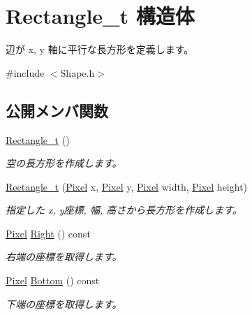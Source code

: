 \hypertarget{struct_rectangle__t}{}\section{Rectangle\+\_\+t 構造体}
\label{struct_rectangle__t}


辺が x, y 軸に平行な長方形を定義します。 




{\ttfamily \#include $<$Shape.\+h$>$}

\subsection*{公開メンバ関数}
\begin{DoxyCompactItemize}
\item 
\hyperlink{struct_rectangle__t_a419db2da2078fe5a55b06992cb90f392}{Rectangle\+\_\+t} ()
\begin{DoxyCompactList}\small\item\em 空の長方形を作成します。\end{DoxyCompactList}\item 
\hyperlink{struct_rectangle__t_a7dc00af20c4d713796472bcf428ee6e3}{Rectangle\+\_\+t} (\hyperlink{_shape_8h_a1532964af24b39019c627e9bcdc22d14}{Pixel} x, \hyperlink{_shape_8h_a1532964af24b39019c627e9bcdc22d14}{Pixel} y, \hyperlink{_shape_8h_a1532964af24b39019c627e9bcdc22d14}{Pixel} width, \hyperlink{_shape_8h_a1532964af24b39019c627e9bcdc22d14}{Pixel} height)
\begin{DoxyCompactList}\small\item\em 指定した x, y座標, 幅, 高さから長方形を作成します。\end{DoxyCompactList}\item 
\hyperlink{_shape_8h_a1532964af24b39019c627e9bcdc22d14}{Pixel} \hyperlink{struct_rectangle__t_ab46f8bc8fec97b0cb5fc09c8a5c7f75b}{Right} () const 
\begin{DoxyCompactList}\small\item\em 右端の座標を取得します。\end{DoxyCompactList}\item 
\hyperlink{_shape_8h_a1532964af24b39019c627e9bcdc22d14}{Pixel} \hyperlink{struct_rectangle__t_a7da08baa214830a212f92793ccca3d9b}{Bottom} () const 
\begin{DoxyCompactList}\small\item\em 下端の座標を取得します。\end{DoxyCompactList}\item 

\end{DoxyCompactItemize}
